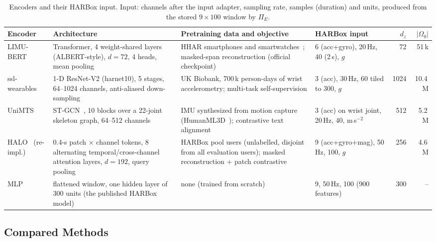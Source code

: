 \begin{table}[!t]
\centering
\caption{Encoders and their HARBox input. Input: channels after the input adapter, sampling
rate, samples (duration) and units, produced from the stored $9\times100$ window by $\Pi_E$.}
\label{tab:encoders}
\footnotesize
\setlength{\tabcolsep}{4pt}
\renewcommand{\arraystretch}{1.15}
\begin{tabularx}{\textwidth}{@{}l Y Y l r r@{}}
\toprule
Encoder & Architecture & Pretraining data and objective & HARBox input & $d_z$ & $|\Omega_0|$ \\
\midrule
LIMU-BERT~\cite{xu2021limubert} &
  Transformer, 4 weight-shared layers (ALBERT-style), $d=72$, 4 heads, mean pooling &
  HHAR smartphones and smartwatches~\cite{stisen2015smart}; masked-span reconstruction (official checkpoint) &
  6 (acc+gyro), 20\,Hz, 40 (2\,s), $g$ & 72 & 51\,k \\
ssl-wearables~\cite{yuan2024selfsupervised} &
  1-D ResNet-V2 (harnet10), 5 stages, 64--1024 channels, anti-aliased down-sampling &
  UK Biobank, 700\,k person-days of wrist accelerometry; multi-task self-supervision &
  3 (acc), 30\,Hz, 60 tiled to 300, $g$ & 1024 & 10.4\,M \\
UniMTS~\cite{zhang2024unimts} &
  ST-GCN~\cite{yan2018spatial}, 10 blocks over a 22-joint skeleton graph, 64--512 channels &
  IMU synthesized from motion capture (HumanML3D~\cite{guo2022generating}); contrastive text alignment &
  3 (acc) on wrist joint, 20\,Hz, 40, m\,s$^{-2}$ & 512 & 5.2\,M \\
HALO~\cite{ding2026halo} (re-impl.) &
  0.4-s patch $\times$ channel tokens, 8 alternating temporal/cross-channel attention layers, $d=192$, query pooling &
  HARBox pool users (unlabelled, disjoint from all evaluation users); masked reconstruction + patch contrastive &
  9 (acc+gyro+mag), 50\,Hz, 100, $g$ & 256 & 4.6\,M \\
MLP~\cite{li2023fedchar} &
  flattened window, one hidden layer of 300 units (the published HARBox model) &
  none (trained from scratch) &
  9, 50\,Hz, 100 (900 features) & 300 & -- \\
\bottomrule
\end{tabularx}
\end{table}

\subsection{Compared Methods}\label{sec:data:methods}

